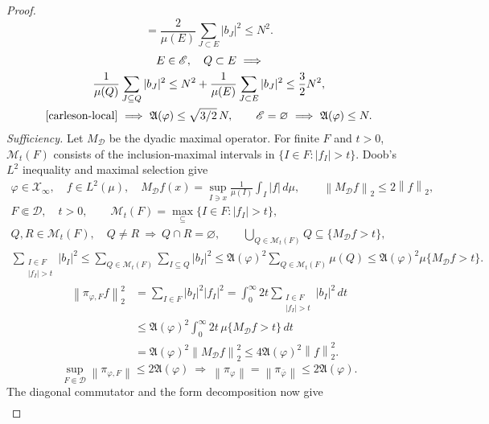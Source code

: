 \documentclass[11pt]{amsart}
\newcommand{\D}{\mathcal D}
\newcommand{\X}{\mathcal X}
\newcommand{\norm}[1]{\left\|#1\right\|}
\newcommand{\fin}{\Subset}
\begin{document}
\begin{proof}
\begin{equation}
  =\frac2{\mu(E)}\sum_{J\subset E}|b_J|^2\le N^2.
\end{equation}
\begin{gather*}
 E\in\mathscr E,\quad Q\subset E
 \ \Longrightarrow\\
 \frac1{\mu(Q)}\sum_{J\subseteq Q}|b_J|^2
  \le N^2+\frac1{\mu(E)}\sum_{J\subset E}|b_J|^2
  \le\frac32N^2,\\
 \eqref{carleson-local}
 \ \Longrightarrow\
 \mathfrak A(\varphi)\le\sqrt{3/2}\,N,\qquad
 \mathscr E=\varnothing\ \Longrightarrow\ \mathfrak A(\varphi)\le N.
\end{gather*}
\emph{Sufficiency.} Let $M_{\D}$ be the dyadic maximal operator.
For finite $F$ and $t>0$, $\mathcal M_t(F)$ consists of the
inclusion-maximal intervals in $\{I\in F:|f_I|>t\}$. Doob's $L^2$
inequality and maximal selection give
\begin{gather*}
 \varphi\in\X_\infty,\quad f\in L^2(\mu),\quad
 M_{\D}f(x)=\sup_{I\ni x}\frac1{\mu(I)}\int_I|f|\,d\mu,\qquad
 \norm{M_{\D}f}_2\le2\norm f_2,\\
 F\fin\D,\quad t>0,\qquad
 \mathcal M_t(F)=\max_{\subseteq}\{I\in F:|f_I|>t\},\\
 Q,R\in\mathcal M_t(F),\quad Q\ne R
 \ \Longrightarrow\ Q\cap R=\varnothing,\qquad
 \bigcup_{Q\in\mathcal M_t(F)}Q\subseteq\{M_{\D}f>t\},\\
 \sum_{\substack{I\in F\\|f_I|>t}}|b_I|^2
  \le\sum_{Q\in\mathcal M_t(F)}\sum_{I\subseteq Q}|b_I|^2
  \le\mathfrak A(\varphi)^2\sum_{Q\in\mathcal M_t(F)}\mu(Q)
  \le\mathfrak A(\varphi)^2\mu\{M_{\D}f>t\}.
\end{gather*}
\begin{align*}
 \norm{\pi_{\varphi,F}f}_2^2
  &=\sum_{I\in F}|b_I|^2|f_I|^2
   =\int_0^\infty2t\sum_{\substack{I\in F\\|f_I|>t}}|b_I|^2\,dt\\
  &\le\mathfrak A(\varphi)^2
           \int_0^\infty2t\,\mu\{M_{\D}f>t\}\,dt\\
  &=\mathfrak A(\varphi)^2\norm{M_{\D}f}_2^2
   \le4\mathfrak A(\varphi)^2\norm f_2^2.
\end{align*}
\begin{equation}\label{pi-bounded}
 \sup_{F\fin\D}\norm{\pi_{\varphi,F}}\le2\mathfrak A(\varphi)
 \ \Longrightarrow\
 \norm{\pi_\varphi}=\norm{\pi_{\overline\varphi}}
                         \le2\mathfrak A(\varphi).
\end{equation}
The diagonal commutator and the form decomposition now give
\begin{gather*}

\end{gather*}
\end{proof}
\end{document}
